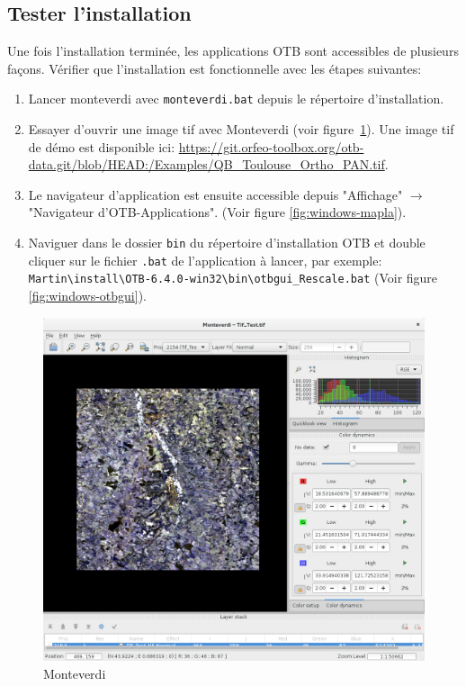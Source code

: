 \documentclass[10pt,a4paper]{article}
\begin{document}
\subsection{Tester l'installation}
Une fois l'installation terminée, les applications OTB sont accessibles de
plusieurs façons. Vérifier que l'installation est fonctionnelle avec les étapes
suivantes:
\begin{enumerate}

\item Lancer monteverdi avec \texttt{monteverdi.bat} depuis le répertoire
d'installation.

\item Essayer d'ouvrir une image tif avec Monteverdi (voir
figure~\ref{fig:monteverdi}). Une image tif de démo est
disponible ici: \url{https://git.orfeo-toolbox.org/otb-data.git/blob/HEAD:/Examples/QB\_Toulouse\_Ortho\_PAN.tif}.

\item Le navigateur d'application est ensuite accessible depuis "Affichage"
$\rightarrow$ "Navigateur d'OTB-Applications".
(Voir figure \ref{fig:windows-mapla}).

\item Naviguer dans le dossier \texttt{bin} du répertoire d'installation OTB et double cliquer sur le
fichier \texttt{.bat} de l'application à lancer, par exemple:\\
\texttt{Martin{\textbackslash}install{\textbackslash}OTB-6.4.0-win32{\textbackslash}bin{\textbackslash}otbgui\_Rescale.bat}
(Voir figure \ref{fig:windows-otbgui}).

\end{enumerate}

\begin{figure}[h]
  \center
  \includegraphics[width=1\textwidth]{Art/monteverdi-tif.png}
  \caption[]{Monteverdi}
  \label{fig:monteverdi}
\end{figure}
\end{document}
